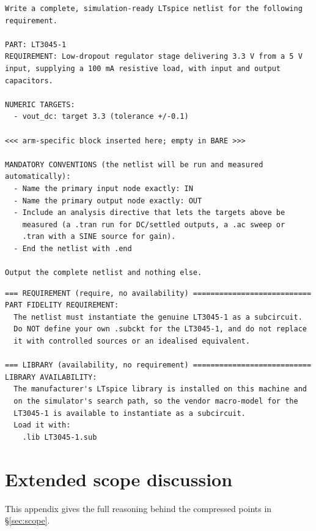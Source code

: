 \begin{lstlisting}[language={}, caption={The \textsc{bare} prompt (case A1).
  \textsc{requirement} and \textsc{library} insert one extra block at the
  marked point; nothing else changes.}, label={lst:prompt}]
Write a complete, simulation-ready LTspice netlist for the following
requirement.

PART: LT3045-1
REQUIREMENT: Low-dropout regulator stage delivering 3.3 V from a 5 V
input, supplying a 100 mA resistive load, with input and output
capacitors.

NUMERIC TARGETS:
  - vout_dc: target 3.3 (tolerance +/-0.1)

<<< arm-specific block inserted here; empty in BARE >>>

MANDATORY CONVENTIONS (the netlist will be run and measured
automatically):
  - Name the primary input node exactly: IN
  - Name the primary output node exactly: OUT
  - Include an analysis directive that lets the targets above be
    measured (a .tran run for DC/settled outputs, a .ac sweep or
    .tran with a SINE source for gain).
  - End the netlist with .end

Output the complete netlist and nothing else.
\end{lstlisting}

\begin{lstlisting}[language={}, caption={The two arm-specific blocks. Neither
  mentions the other's factor.}, label={lst:armblocks}]
=== REQUIREMENT (require, no availability) ===========================
PART FIDELITY REQUIREMENT:
  The netlist must instantiate the genuine LT3045-1 as a subcircuit.
  Do NOT define your own .subckt for the LT3045-1, and do not replace
  it with controlled sources or an idealised equivalent.

=== LIBRARY (availability, no requirement) ===========================
LIBRARY AVAILABILITY:
  The manufacturer's LTspice library is installed on this machine and
  on the simulator's search path, so the vendor macro-model for the
  LT3045-1 is available to instantiate as a subcircuit.
  Load it with:
    .lib LT3045-1.sub
\end{lstlisting}

\section{Extended scope discussion}
\label{app:scope}

This appendix gives the full reasoning behind the compressed points in
\S\ref{sec:scope}.

